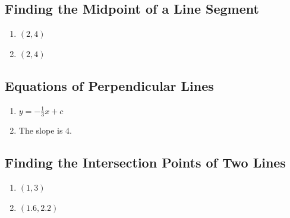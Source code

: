\documentclass[12pt]{article}
\begin{document}
\subsection*{Finding the Midpoint of a Line Segment}
\begin{enumerate}
    \item \((2, 4)\)
    \item \((2, 4)\)
\end{enumerate}

\subsection*{Equations of Perpendicular Lines}
\begin{enumerate}
    \item \(y = -\frac{1}{3}x + c\)
    \item The slope is \(4\).
\end{enumerate}

\subsection*{Finding the Intersection Points of Two Lines}
\begin{enumerate}
    \item \((1, 3)\)
    \item \((1.6, 2.2)\)
\end{enumerate}
\end{document}
